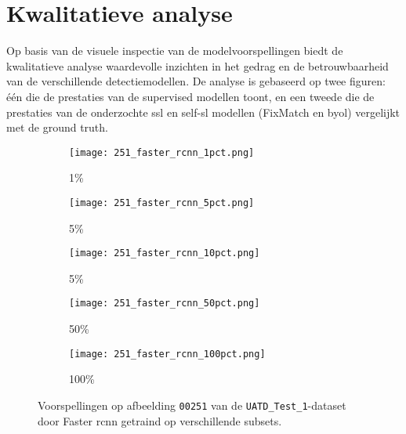 \section{Kwalitatieve analyse}

Op basis van de visuele inspectie van de modelvoorspellingen biedt de kwalitatieve analyse waardevolle inzichten in het gedrag en de betrouwbaarheid van de verschillende detectiemodellen. De analyse is gebaseerd op twee figuren: één die de prestaties van de supervised modellen toont, en een tweede die de prestaties van de onderzochte \gls{ssl} en \gls{self-sl} modellen (FixMatch en \gls{byol}) vergelijkt met de ground truth.

\begin{figure}[H]
    \centering
    \begin{subfigure}{.2\textwidth}
        \centering
        \captionsetup{justification=centering}
        \texttt{[image: 251\_faster\_rcnn\_1pct.png]}
        \caption[Voorspelling Faster R-CNN 1\%]{1\%}
    \end{subfigure}%
    \begin{subfigure}{.2\textwidth}
        \centering
        \captionsetup{justification=centering}
        \texttt{[image: 251\_faster\_rcnn\_5pct.png]}
        \caption[Voorspelling Faster R-CNN 5\%]{5\%}
    \end{subfigure}%
    \begin{subfigure}{.2\textwidth}
        \centering
        \captionsetup{justification=centering}
        \texttt{[image: 251\_faster\_rcnn\_10pct.png]}
        \caption[Voorspelling Faster R-CNN 5\%]{5\%}
    \end{subfigure}%
    \begin{subfigure}{.2\textwidth}
        \centering
        \captionsetup{justification=centering}
        \texttt{[image: 251\_faster\_rcnn\_50pct.png]}
        \caption[Voorspelling Faster R-CNN 50\%]{50\%}
    \end{subfigure}%
    \begin{subfigure}{.2\textwidth}
        \centering
        \captionsetup{justification=centering}
        \texttt{[image: 251\_faster\_rcnn\_100pct.png]}
        \caption[Voorspelling Faster R-CNN 100\%]{100\%}
    \end{subfigure}%
    \caption[Voorspellingen door supervised modellen.]{Voorspellingen op afbeelding \texttt{00251} van de \texttt{UATD\_Test\_1}-dataset door Faster \gls{rcnn} getraind op verschillende subsets.}
\end{figure}

